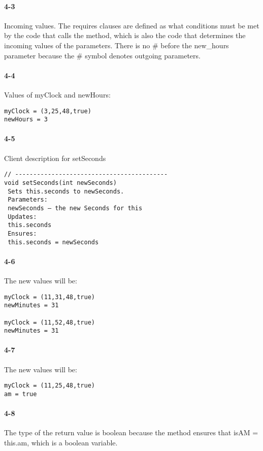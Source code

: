 \documentclass[10pt]{article}
\begin{document}
\paragraph{4-3} Incoming values. The requires clauses are defined as what conditions must be met by the code that calls the method, which is also the code that determines the incoming values of the parameters. There is no \# before the new\_hours parameter because the \# symbol denotes outgoing parameters. 
\paragraph{4-4}
Values of myClock and newHours: 
\begin{lstlisting}
myClock = (3,25,48,true)
newHours = 3
\end{lstlisting}

\vspace{30mm}

\paragraph{4-5} Client description for setSeconds
\begin{lstlisting}
// ------------------------------------------
void setSeconds(int newSeconds)
 Sets this.seconds to newSeconds.
 Parameters:
 newSeconds – the new Seconds for this
 Updates:
 this.seconds
 Ensures:
 this.seconds = newSeconds 
\end{lstlisting}

\paragraph{4-6}The new values will be: 
\begin{lstlisting}
myClock = (11,31,48,true)
newMinutes = 31

myClock = (11,52,48,true)
newMinutes = 31

\end{lstlisting}

\paragraph{4-7}The new values will be: 
\begin{lstlisting}
myClock = (11,25,48,true)
am = true

\end{lstlisting}

\paragraph{4-8} The type of the return value is boolean because the method ensures that isAM = this.am, which is a boolean variable. 
\end{document}
